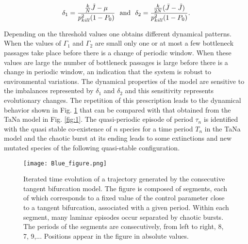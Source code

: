 \documentclass[12pt]{article}
\begin{document}
\begin{equation}
\centering
 \delta_1 = \frac{\frac{k}{N}\tilde{J}-\mu}{p^2_{kill}(1-P_0)} \ \ \mathrm{and} \  \ \delta_2 = \frac{\frac{k}{2N}(\bar{J}-\tilde{J})}{p^2_{kill}(1-P_0)}. 
\end{equation}
\vspace{6pt}

Depending on the threshold values one obtains different dynamical patterns. When the values of  $\Gamma_1$ and $\Gamma_2$ are small only one or at most a few bottleneck passages take place before there is a change of periodic window. When these values are large the number of bottleneck passages is large before there is a change in periodic window, an indication that the system is robust to environmental variations. The dynamical properties of the model are sensitive to the imbalances represented by $\delta_1$ and $\delta_2$ and this sensitivity represents evolutionary changes. The repetition of this prescription leads to the dynamical behavior shown in Fig. \ref{blue_fig} that can be compared with that obtained from the TaNa model in Fig. \ref{fig:1}. The quasi-periodic episode of period $\tau_{n}$ is identified with the quasi stable co-existence of $n$ species for a time
period $T_{n}$ in the TaNa model and the chaotic burst at its ending leads
to some extinctions and new mutated species of the following quasi-stable configuration.

\begin{figure}[ht!]%
\texttt{[image: Blue\_figure.png]}%
\caption{Iterated time evolution of a trajectory generated by the consecutive tangent bifurcation model. The figure is composed of segments, each of which corresponds to a fixed value of the control parameter close to a tangent bifurcation, associated with a given period. Within each segment, many laminar episodes occur separated by chaotic bursts. The periods of the segments are consecutively, from left to right, 8, 7, 9,...  Positions appear in the figure in absolute values.}%
\label{blue_fig}%
\end{figure}

\end{document}
